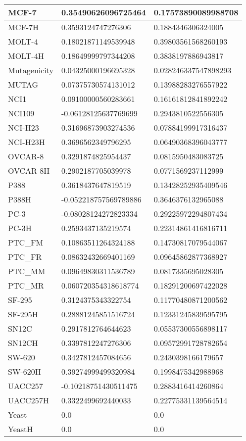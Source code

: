 \documentclass{article}
\begin{document}
\begin{table}[!ht]
\begin{tabular}{|l|l|l|}
        MCF-7 & 0.35490626096725464 & 0.17573890089988708 \\ \hline
        MCF-7H & 0.3593124747276306 & 0.1884346306324005 \\ \hline
        MOLT-4 & 0.18021871149539948 & 0.39803561568260193 \\ \hline
        MOLT-4H & 0.18649999797344208 & 0.3838197886943817 \\ \hline
        Mutagenicity & 0.04325000196695328 & 0.028246337547898293 \\ \hline
        MUTAG & 0.07375730574131012 & 0.13988283276557922 \\ \hline
        NCI1 & 0.09100000560283661 & 0.16161812841892242 \\ \hline
        NCI109 & -0.06128125637769699 & 0.2943810522556305 \\ \hline
        NCI-H23 & 0.31696873903274536 & 0.07884199917316437 \\ \hline
        NCI-H23H & 0.3696562349796295 & 0.06490368396043777 \\ \hline
        OVCAR-8 & 0.3291874825954437 & 0.0815950483083725 \\ \hline
        OVCAR-8H & 0.2902187705039978 & 0.0771569237112999 \\ \hline
        P388 & 0.3618437647819519 & 0.13428252935409546 \\ \hline
        P388H & -0.052218757569789886 & 0.3646376132965088 \\ \hline
        PC-3 & -0.08028124272823334 & 0.29225972294807434 \\ \hline
        PC-3H & 0.2593437135219574 & 0.22314861416816711 \\ \hline
        PTC\_FM & 0.10863511264324188 & 0.14730817079544067 \\ \hline
        PTC\_FR & 0.08632432669401169 & 0.09645862877368927 \\ \hline
        PTC\_MM & 0.09649830311536789 & 0.0817335695028305 \\ \hline
        PTC\_MR & 0.060720354318618774 & 0.18291200697422028 \\ \hline
        SF-295 & 0.3124375343322754 & 0.11770480871200562 \\ \hline
        SF-295H & 0.28881245851516724 & 0.12331245839595795 \\ \hline
        SN12C & 0.2917812764644623 & 0.05537300556898117 \\ \hline
        SN12CH & 0.3397812247276306 & 0.09572991728782654 \\ \hline
        SW-620 & 0.3427812457084656 & 0.2430398166179657 \\ \hline
        SW-620H & 0.39274999499320984 & 0.1998475342988968 \\ \hline
        UACC257 & -0.10218751430511475 & 0.2883416414260864 \\ \hline
        UACC257H & 0.3322499692440033 & 0.22775331139564514 \\ \hline
        Yeast & 0.0 & 0.0 \\ \hline
        YeastH & 0.0 & 0.0 \\ \hline
    \end{tabular}
\end{table}
\end{document}
